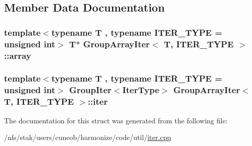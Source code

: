 \subsection{Member Data Documentation}
\hypertarget{structGroupArrayIter_a66da0a8097f1b86ab15ae9172610861c}{
\subsubsection[{array}]{\setlength{\rightskip}{0pt plus 5cm}template$<$typename T , typename I\-T\-E\-R\-\_\-\-T\-Y\-P\-E  = unsigned int$>$ T$\ast$ {\bf Group\-Array\-Iter}$<$ T, I\-T\-E\-R\-\_\-\-T\-Y\-P\-E $>$\-::array}}\label{structGroupArrayIter_a66da0a8097f1b86ab15ae9172610861c}
\hypertarget{structGroupArrayIter_a19527413babf9e9aeb2f219c0551eb1e}{
\subsubsection[{iter}]{\setlength{\rightskip}{0pt plus 5cm}template$<$typename T , typename I\-T\-E\-R\-\_\-\-T\-Y\-P\-E  = unsigned int$>$ {\bf Group\-Iter}$<${\bf Iter\-Type}$>$ {\bf Group\-Array\-Iter}$<$ T, I\-T\-E\-R\-\_\-\-T\-Y\-P\-E $>$\-::iter}}\label{structGroupArrayIter_a19527413babf9e9aeb2f219c0551eb1e}


The documentation for this struct was generated from the following file\-:\begin{DoxyCompactItemize}
\item 
/nfs/stak/users/cuneob/harmonize/code/util/\hyperlink{iter_8cpp}{iter.\-cpp}\end{DoxyCompactItemize}
